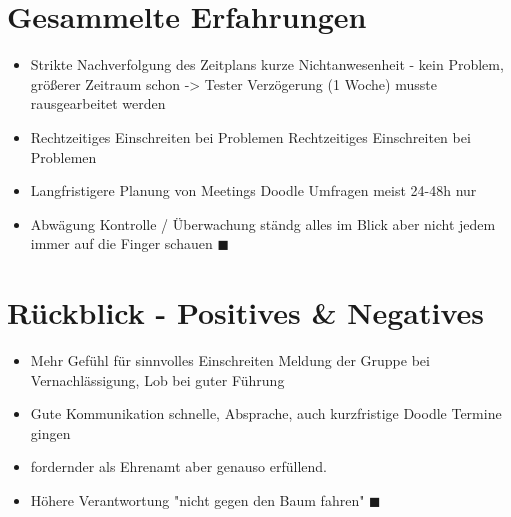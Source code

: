\documentclass[ignorenonframetext, 11pt, table]{beamer}
\begin{document}
\section{Gesammelte Erfahrungen}
\begin{frame}
	\begin{itemize}
		\item<1-> Strikte Nachverfolgung des Zeitplans
			 {kurze Nichtanwesenheit - kein Problem, größerer Zeitraum schon -> Tester \newline Verzögerung (1 Woche) musste rausgearbeitet werden}
		\item<2-> Rechtzeitiges Einschreiten bei Problemen
			 {Rechtzeitiges Einschreiten bei Problemen}
		\item<3-> Langfristigere Planung von Meetings
			 {Doodle Umfragen meist 24-48h nur}
		\item<4-> Abwägung Kontrolle / Überwachung
			 {ständg alles im Blick aber nicht jedem immer auf die Finger schauen $\blacksquare$}
	\end{itemize}
\end{frame}

\section{Rückblick - Positives \& Negatives}
\begin{frame}
	\begin{itemize}
		\item<1-> Mehr Gefühl für sinnvolles Einschreiten
			 {Meldung der Gruppe bei Vernachlässigung, Lob bei guter Führung}
		\item<2-> Gute Kommunikation
			 {schnelle, Absprache, auch kurzfristige Doodle Termine gingen}
		\item<3-> fordernder als Ehrenamt
			 {aber genauso erfüllend.}
		\item<4-> Höhere Verantwortung
			 {"nicht gegen den Baum fahren" $\blacksquare$}
	\end{itemize}
\end{frame}
\end{document}
